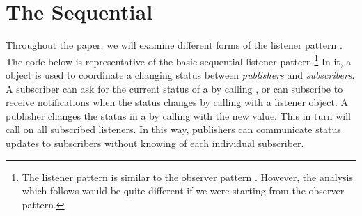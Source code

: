 \documentclass{llncs}
\begin{document}
\section{The Sequential }

Throughout the paper, we will examine different forms of the listener
pattern \cite{Englander:beans}. The code below is representative
of the basic sequential listener pattern.\footnote{
%
The listener pattern \cite{Englander:beans} is similar to the observer
pattern \cite{gamma:patterns}. However, the analysis which follows
would be quite different if we were starting from the observer
pattern.}
%
In it, a  object is used to coordinate a changing
status between \emph{publishers} and \emph{subscribers}.  A subscriber
can ask for the current status of a  by calling
, or can subscribe to receive notifications when the
status changes by calling  with a listener object.
A publisher changes the status in a  by calling
 with the new value.  This in turn will call
 on all subscribed listeners.  In this way,
publishers can communicate status updates to subscribers without
knowing of each individual subscriber.
\end{document}

